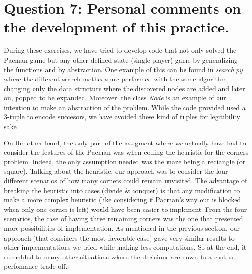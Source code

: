\documentclass{article}
\begin{document}
\section{Question 7: Personal comments on the development of this practice.}

During these exercises, we have tried to develop code that not only solved the Pacman game but any other defined-state (single player) game by generalizing the functions and by abstraction. One example of this can be found in \textit{search.py} where the different search methods are performed with the same algorithm, changing only the data structure where the discovered nodes are added and later on, popped to be expanded. Moreover, the class \textit{Node} is an example of our intention to make an abstraction of the problem. While the code provided used a 3-tuple to encode succesors, we have avoided these kind of tuples for legitibility sake.

On the other hand, the only part of the assigment where we actually have had to consider the features of the Pacman was when coding the heuristic for the corners problem. Indeed, the only assumption needed was the maze being a rectangle (or square). Talking about the heuristic, our approach was to consider the four different scenarios of how many corners could remain unvisited. The advantage of breaking the heuristic into cases (divide \& conquer) is that any modification to make a more complex heuristic (like considering if Pacman's way out is blocked when only one corner is left) would have been easier to implement. From the four scenarios, the case of having three remaining corners was the one that presented more possibilities of implementation. As mentioned in the previous section, our approach (that considers the most favorable case) gave very similar results to other implementations we tried while making less computations. So at the end, it resembled to many other situations where the decisions are down to a cost vs perfomance trade-off.
\end{document}
